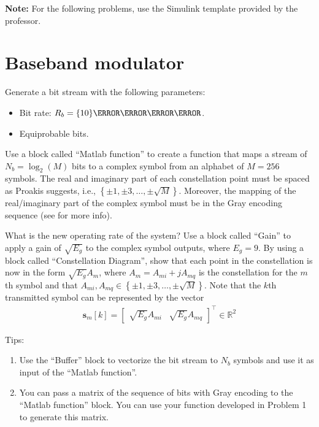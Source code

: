 \documentclass[12pt,a4paper]{article}
\begin{document}
\textbf{Note:} For the following problems, use the Simulink template provided by the professor.

\section{Baseband modulator}

\problem \label{probtwo}
Generate a bit stream with the following parameters:
\begin{itemize}
    \item Bit rate: \(R_b = \qty{10}{\mega\bit\per\second}\).
    \item Equiprobable bits.
\end{itemize}

\problem \label{probthree}
Use a block called ``Matlab function'' to create a function that maps a stream of \(N_b = \log_2\left( M \right)\) bits to a complex symbol from an alphabet of \(M=256\) symbols. The real and imaginary part of each constellation point must be spaced as Proakis suggests, i.e., \(\left\{ \pm1, \pm3, \dots, \pm\sqrt{M} \right\}\). Moreover, the mapping of the real/imaginary part of the complex symbol must be in the Gray encoding sequence (see \cite{proakisDigitalCommunications2007} for more info).

\subproblem What is the new operating rate of the system?
\subproblem Use a block called ``Gain'' to apply a gain of \(\sqrt{E_g}\) to the complex symbol outputs, where \(E_g = 9\).
\subproblem By using a block called ``Constellation Diagram'', show that each point in the constellation is now in the form \(\sqrt{E_g} A_m\), where \(A_m = A_{mi}+j A_{mq}\) is the constellation for the \(m\)th symbol and that \(A_{mi}, A_{mq} \in \left\{ \pm1, \pm3, \dots, \pm\sqrt{M} \right\}\). Note that the \(k\)th transmitted symbol can be represented by the vector
\begin{align}
    \mathbf{s}_m\left[ k \right] = \begin{bmatrix}
        \sqrt{E_g}A_{mi} & \sqrt{E_g}A_{mq}
    \end{bmatrix}^\top \in \mathbb{R}^{2}
\end{align}

Tips:
\begin{enumerate}
    \item Use the ``Buffer'' block to vectorize the bit stream to \(N_b\) symbols and use it as input of the ``Matlab function''.
    \item You can pass a matrix of the sequence of bits with Gray encoding to the ``Matlab function'' block. You can use your function developed in Problem 1 to generate this matrix.
\end{enumerate}
\end{document}
